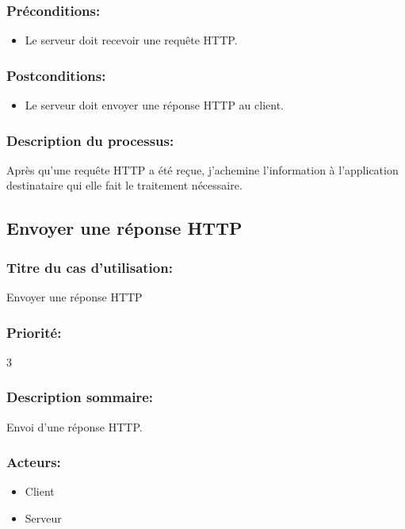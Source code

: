 \documentclass{scrreprt}
\begin{document}
\subsubsection{Préconditions:}
\begin{itemize}
    \item Le serveur doit recevoir une requête HTTP. 
\end{itemize} 

\subsubsection{Postconditions:}
\begin{itemize}
    \item Le serveur doit envoyer une réponse HTTP au client. 
\end{itemize}
 
\subsubsection{Description du processus:}
Après qu'une requête HTTP a été reçue, j'achemine l'information à 
l'application destinataire qui elle fait le traitement nécessaire.

\subsection{Envoyer une réponse HTTP}

\subsubsection{Titre du cas d'utilisation:} Envoyer une réponse HTTP
\subsubsection{Priorité:} 3
\subsubsection{Description sommaire:}
Envoi d'une réponse HTTP.

\subsubsection{Acteurs:}
\begin{itemize}
	\item Client
	\item Serveur
\end{itemize}
\end{document}

